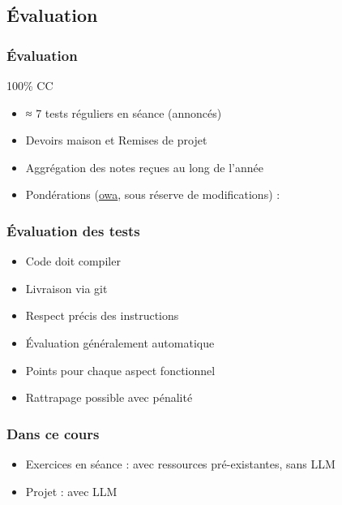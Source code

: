\documentclass[english, french]{beamer}
\begin{document}
\subsection{Évaluation}
\begin{frame}
	\frametitle{Évaluation}
	100\% CC
	\begin{itemize}
		\item ≈ 7 tests réguliers en séance (annoncés)
		\item Devoirs maison et Remises de projet
		\item Aggrégation des notes reçues au long de l’année
		\item 
    Pondérations {\tiny (\og{}\href{https://en.wikipedia.org/wiki/Ordered_weighted_averaging}{owa}\fg, sous réserve de modifications)} :
  \end{itemize}
\end{frame}

\begin{frame}
	\frametitle{Évaluation des tests}
	\begin{itemize}
		\item Code doit compiler
		\item Livraison via git
		\item Respect précis des instructions
		\item Évaluation généralement automatique
		\item Points pour chaque aspect fonctionnel
		\item Rattrapage possible avec pénalité
	\end{itemize}
\end{frame}

\begin{frame}
	\frametitle{Dans ce cours}
	\begin{itemize}
		\item Exercices en séance : avec ressources pré-existantes, sans LLM
		\item Projet : avec LLM
	\end{itemize}
\end{frame}
\end{document}
